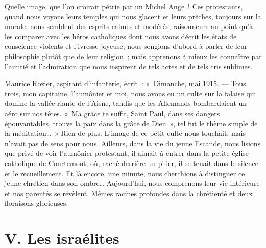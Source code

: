 \documentclass[french,twoside]{book} %
\newcommand\chapteropen{} %
\newcommand\chapterclose{} %
\begin{document}
\noindent Quelle image, que l’on croirait pétrie par un Michel Ange ! Ces protestants, quand nous voyons leurs temples qui nous glacent et leurs prêches, toujours sur la morale, nous semblent des esprits calmes et modérés, raisonneurs au point qu’à les comparer avec les héros catholiques dont nous avons décrit les états de conscience violents et l’ivresse joyeuse, nous songions d’abord à parler de leur philosophie plutôt que de leur religion ; mais apprenons à mieux les connaître par l’amitié et l’admiration que nous inspirent de tels actes et de tels cris sublimes.‌\par
Maurice Rozier, aspirant d’infanterie, écrit : « Dimanche, mai 1915. — Tous trois, mon capitaine, l’aumônier et moi, nous avons eu un culte sur la falaise qui domine la vallée riante de l’Aisne, tandis que les Allemands bombardaient un aéro sur nos têtes. « Ma grâce te suffit, Saint Paul, dans ses dangers épouvantables, trouve la paix dans la grâce de Dieu », tel fut le thème simple de la méditation… » Rien de plus. L’image de ce petit culte nous touchait, mais n’avait pas de sens pour nous. Ailleurs, dans la vie du jeune Escande, nous lisions que privé de voir l’aumônier protestant, il aimait à entrer dans la petite église catholique de Courtemont, où, caché derrière un pilier, il se tenait dans le silence et le recueillement. Et là encore, une minute, nous cherchions à distinguer ce jeune chrétien dans son ombre… Aujourd’hui, nous comprenons leur vie intérieure et nos parentés se révèlent. Mêmes racines profondes dans la chrétienté et deux floraisons glorieuses.‌
\chapterclose


\chapteropen
\chapter[V. Les israélites]{V. Les israélites}\renewcommand{\leftmark}{V. Les israélites}
\end{document}
